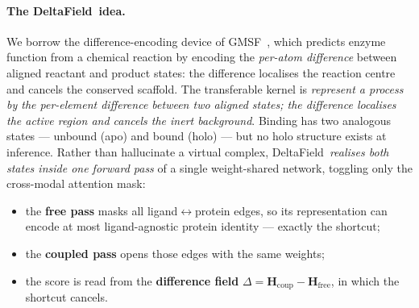 \documentclass[11pt,a4paper]{article}
\newcommand{\df}{DeltaField\xspace}
\newcommand{\Hfree}{\mathbf{H}_{\text{free}}}
\newcommand{\Hcoup}{\mathbf{H}_{\text{coup}}}
\begin{document}
\paragraph{The \df\ idea.}
We borrow the difference-encoding device of GMSF~\citep{zhao2026gmsf}, which
predicts enzyme function from a chemical reaction by encoding the
\emph{per-atom difference} between aligned reactant and product states: the
difference localises the reaction centre and cancels the conserved scaffold.
The transferable kernel is \emph{represent a process by the per-element
difference between two aligned states; the difference localises the active
region and cancels the inert background}. Binding has two analogous states
--- unbound (apo) and bound (holo) --- but no holo structure exists at
inference. Rather than hallucinate a virtual complex, \df\ \emph{realises both
states inside one forward pass} of a single weight-shared network, toggling
only the cross-modal attention mask:
\begin{itemize}[leftmargin=*,itemsep=1pt,topsep=2pt]
  \item the \textbf{free pass} masks all ligand$\leftrightarrow$protein edges,
        so its representation can encode at most ligand-agnostic protein
        identity --- exactly the shortcut;
  \item the \textbf{coupled pass} opens those edges with the same weights;
  \item the score is read from the \textbf{difference field}
        $\Delta=\Hcoup-\Hfree$, in which the shortcut cancels.
\end{itemize}
\end{document}
